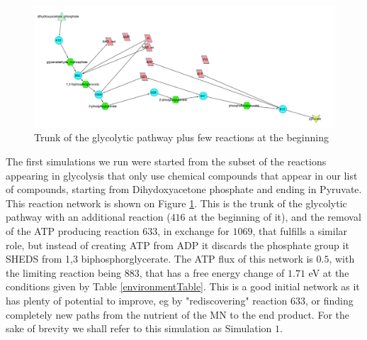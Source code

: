 \documentclass[10pt,a4paper]{article}
\begin{document}
\begin{figure}[htpb]
	\centering
	\includegraphics[width=1\linewidth]{trunk_glyc_init.pdf}
	\caption{Trunk of the glycolytic pathway plus few reactions at the beginning}
	\label{fig:truncglycinit}
\end{figure}


The first simulations we run were started from the subset of the reactions appearing in glycolysis that only use chemical compounds that appear in our list of compounds, starting from Dihydoxyacetone phosphate and ending in Pyruvate. This reaction network is shown on Figure \ref{fig:truncglycinit}. This is the trunk of the glycolytic pathway with an additional reaction ($416$ at the beginning of it), and the removal of the ATP producing reaction $633$, in exchange for $1069$, that fulfills a similar role, but instead of creating ATP from ADP it discards the phosphate group it SHEDS from 1,3 biphosphorglycerate. The ATP flux of this network is $0.5$, with the limiting reaction being $883$, that has a free energy change of $1.71$ eV at the conditions given by Table \ref{environmentTable}. This is a good initial network as it has plenty of potential to improve, eg by "rediscovering" reaction $633$, or finding completely new paths from the nutrient of the MN to the end product. For the sake of brevity we shall refer to this simulation as Simulation $1$.
\end{document}
